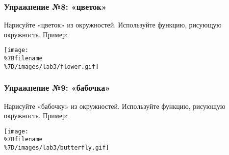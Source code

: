 \subsubsection{Упражнение №8:
«цветок»}\label{ux443ux43fux440ux430ux436ux43dux435ux43dux438ux435-8-ux446ux432ux435ux442ux43eux43a}

Нарисуйте «цветок» из окружностей. Используйте функцию, рисующую
окружность. Пример:

\texttt{[image: \\\%7Bfilename\\\%7D/images/lab3/flower.gif]}

\begin{Shaded}
\begin{Highlighting}[]
 
 

\OperatorTok{=} 
\OperatorTok{=} 
\OperatorTok{=} 
\OperatorTok{=} \OperatorTok{*}\OperatorTok{*}\OperatorTok{/}
\OperatorTok{=} \OperatorTok{*}\NormalTok{(}\OperatorTok{/}

 
      
        \OperatorTok{*}\NormalTok{(}\OperatorTok{-}

\NormalTok{)}

  
    \NormalTok{)}
    \OperatorTok{-}\NormalTok{)}
    \OperatorTok{/}
\end{Highlighting}
\end{Shaded}

\subsubsection{Упражнение №9:
«бабочка»}\label{ux443ux43fux440ux430ux436ux43dux435ux43dux438ux435-9-ux431ux430ux431ux43eux447ux43aux430}

Нарисуйте «бабочку» из окружностей. Используйте функцию, рисующую
окружность. Пример:

\texttt{[image: \\\%7Bfilename\\\%7D/images/lab3/butterfly.gif]}

